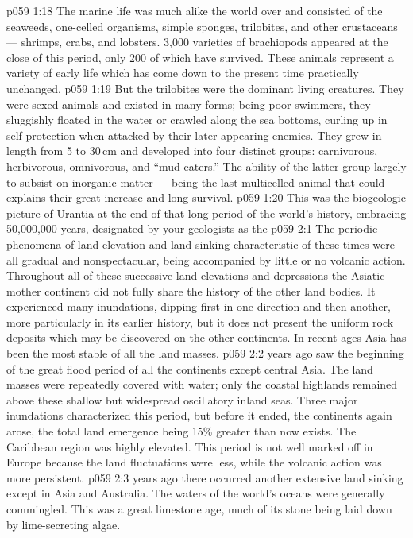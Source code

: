 \vs p059 1:18 \pc The marine life was much alike the world over and consisted of the seaweeds, one\hyp{}celled organisms, simple sponges, trilobites, and other crustaceans --- shrimps, crabs, and lobsters. 3,000 varieties of brachiopods appeared at the close of this period, only 200 of which have survived. These animals represent a variety of early life which has come down to the present time practically unchanged.
\vs p059 1:19 But the trilobites were the dominant living creatures. They were sexed animals and existed in many forms; being poor swimmers, they sluggishly floated in the water or crawled along the sea bottoms, curling up in self\hyp{}protection when attacked by their later appearing enemies. They grew in length from 5 to 30\,cm and developed into four distinct groups: carnivorous, herbivorous, omnivorous, and “mud eaters.” The ability of the latter group largely to subsist on inorganic matter --- being the last multicelled animal that could --- explains their great increase and long survival.
\vs p059 1:20 This was the biogeologic picture of Urantia at the end of that long period of the world’s history, embracing 50,000,000 years, designated by your geologists as the 
\vs p059 2:1 The periodic phenomena of land elevation and land sinking characteristic of these times were all gradual and nonspectacular, being accompanied by little or no volcanic action. Throughout all of these successive land elevations and depressions the Asiatic mother continent did not fully share the history of the other land bodies. It experienced many inundations, dipping first in one direction and then another, more particularly in its earlier history, but it does not present the uniform rock deposits which may be discovered on the other continents. In recent ages Asia has been the most stable of all the land masses.
\vs p059 2:2 \pc {} years ago saw the beginning of the great flood period of all the continents except central Asia. The land masses were repeatedly covered with water; only the coastal highlands remained above these shallow but widespread oscillatory inland seas. Three major inundations characterized this period, but before it ended, the continents again arose, the total land emergence being 15\% greater than now exists. The Caribbean region was highly elevated. This period is not well marked off in Europe because the land fluctuations were less, while the volcanic action was more persistent.
\vs p059 2:3 \pc {} years ago there occurred another extensive land sinking except in Asia and Australia. The waters of the world’s oceans were generally commingled. This was a great limestone age, much of its stone being laid down by lime\hyp{}secreting algae.
